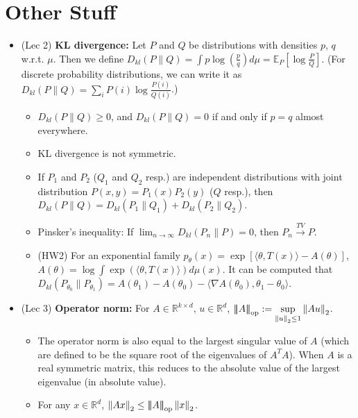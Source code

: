 \documentclass[twoside]{article}
\newcommand{\dis}{\displaystyle}
\newcommand{\norm}[1]{\left\|{#1}\right\|} %
\newcommand{\ltwo}[1]{\norm{#1}_2} %
\newcommand{\matrixnorm}[1]{\left|\!\left|\!\left|{#1}
  \right|\!\right|\!\right|} %
\newcommand{\opnorm}[1]{\matrixnorm{#1}_{\rm op}}
\newcommand\bbE{\mathbb{E}}
\newcommand\bbR{\mathbb{R}}
\def\t{\theta}
\newcommand\goesto{\rightarrow}
\begin{document}
\section{Other Stuff}
\begin{itemize}
\item (Lec 2) \textbf{KL divergence:} Let $P$ and $Q$ be distributions with densities $p$, $q$ w.r.t. $\mu$. Then we define $D_{kl}(P \parallel Q) = \dis\int p \log\left(\frac{p}{q}\right) d \mu = \bbE_P \left[ \log \dis\frac{P}{Q} \right]$. (For discrete probability distributions, we can write it as $D_{kl}(P \parallel Q) =\dis\sum_i P(i) \log \dis\frac{P(i)}{Q(i)}$.)
\begin{itemize}
\item $D_{kl}(P \parallel Q) \geq 0$, and $D_{kl}(P \parallel Q) =  0$ if and only if $p=q$ almost everywhere.

\item KL divergence is not symmetric.

\item If $P_1$ and $P_2$ ($Q_1$ and $Q_2$ resp.) are independent distributions with joint distribution $P(x,y) = P_1(x)P_2(y)$ ($Q$ resp.), then $D_{kl}(P \parallel Q) = D_{kl}(P_1 \parallel Q_1) + D_{kl}(P_2 \parallel Q_2)$.

\item Pinsker's inequality: If $\dis\lim_{n \goesto \infty} D_{kl}(P_n \parallel P) = 0$, then $P_n \stackrel{TV}{\goesto} P$.

\item (HW2) For an exponential family $p_\t(x) = \exp [\langle \t, T(x) \rangle - A(\t)]$, $A(\t) = \log \dis\int \exp (\langle \t, T(x) \rangle) d\mu(x)$. It can be computed that $D_{kl}(P_{\t_0} \parallel P_{\t_1}) = A(\t_1) - A(\t_0) - \langle \nabla A(\t_0), \t_1 - \t_0 \rangle$.

\end{itemize}

\item (Lec 3) \textbf{Operator norm:} For $A \in \bbR^{k \times d}$, $u \in \bbR^d$, $\opnorm{A} := \dis\sup_{\ltwo{u} \leq 1} \ltwo{Au}$.
\begin{itemize}
\item The operator norm is also equal to the largest singular value of $A$ (which are defined to be the square root of the eigenvalues of $A^T A$). When $A$ is a real symmetric matrix, this reduces to the absolute value of the largest eigenvalue (in absolute value).

\item For any $x \in \bbR^d$, $\ltwo{Ax} \leq \opnorm{A}\ltwo{x}$.


\end{itemize}
\end{itemize}
\end{document}
